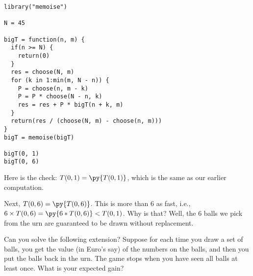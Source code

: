 \begin{exercise}
\begin{solution}
\begin{pyblock}
\end{pyblock}
\begin{verbatim}
library("memoise")

N = 45

bigT = function(n, m) {
  if(n >= N) {
    return(0)
  }
  res = choose(N, m)
  for (k in 1:min(m, N - n)) {
    P = choose(n, m - k)
    P = P * choose(N - n, k)
    res = res + P * bigT(n + k, m)
  }
  return(res / (choose(N, m) - choose(n, m)))
}
bigT = memoise(bigT)

bigT(0, 1)
bigT(0, 6)
\end{verbatim}
Here is the check: $T(0, 1) = \py{T(0, 1)}$, which is the same as our earlier computation.

Next, $T(0, 6) = \py{T(0,6)}$.
This is more than $6$ as fast, i.e., $6\times T(0, 6) = \py{6*T(0, 6)} < T(0,1)$.
Why is that?
Well, the 6 balls we pick from the urn are guaranteed to be drawn without replacement.


Can you solve the following extension? Suppose for each time you draw a set of balls, you get the value (in Euro's say) of the numbers on the balls, and then you put the balls back in the urn.
The game stops when you have seen all balls at least once. What is your expected gain?

\end{solution}
\end{exercise}
